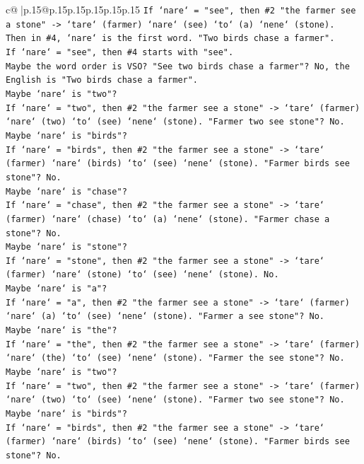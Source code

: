 \documentclass{article}
\begin{document}
{\begin{supertabular}{c@{$\;$}|p{.15\linewidth}@{}p{.15\linewidth}p{.15\linewidth}p{.15\linewidth}p{.15\linewidth}p{.15\linewidth}}
{{{\texttt{If `nare` = "see", then \#2 "the farmer see a stone" {-}> `tare` (farmer) `nare` (see) `to` (a) `nene` (stone).} \\
\texttt{Then in \#4, `nare` is the first word. "Two birds chase a farmer".} \\
\texttt{If `nare` = "see", then \#4 starts with "see".} \\
\texttt{Maybe the word order is VSO? "See two birds chase a farmer"? No, the English is "Two birds chase a farmer".} \\
\texttt{Maybe `nare` is "two"?} \\
\texttt{If `nare` = "two", then \#2 "the farmer see a stone" {-}> `tare` (farmer) `nare` (two) `to` (see) `nene` (stone). "Farmer two see stone"? No.} \\
\texttt{Maybe `nare` is "birds"?} \\
\texttt{If `nare` = "birds", then \#2 "the farmer see a stone" {-}> `tare` (farmer) `nare` (birds) `to` (see) `nene` (stone). "Farmer birds see stone"? No.} \\
\texttt{Maybe `nare` is "chase"?} \\
\texttt{If `nare` = "chase", then \#2 "the farmer see a stone" {-}> `tare` (farmer) `nare` (chase) `to` (a) `nene` (stone). "Farmer chase a stone"? No.} \\
\texttt{Maybe `nare` is "stone"?} \\
\texttt{If `nare` = "stone", then \#2 "the farmer see a stone" {-}> `tare` (farmer) `nare` (stone) `to` (see) `nene` (stone). No.} \\
\texttt{Maybe `nare` is "a"?} \\
\texttt{If `nare` = "a", then \#2 "the farmer see a stone" {-}> `tare` (farmer) `nare` (a) `to` (see) `nene` (stone). "Farmer a see stone"? No.} \\
\texttt{Maybe `nare` is "the"?} \\
\texttt{If `nare` = "the", then \#2 "the farmer see a stone" {-}> `tare` (farmer) `nare` (the) `to` (see) `nene` (stone). "Farmer the see stone"? No.} \\
\texttt{Maybe `nare` is "two"?} \\
\texttt{If `nare` = "two", then \#2 "the farmer see a stone" {-}> `tare` (farmer) `nare` (two) `to` (see) `nene` (stone). "Farmer two see stone"? No.} \\
\texttt{Maybe `nare` is "birds"?} \\
\texttt{If `nare` = "birds", then \#2 "the farmer see a stone" {-}> `tare` (farmer) `nare` (birds) `to` (see) `nene` (stone). "Farmer birds see stone"? No.} \\
}}}
\end{supertabular}}
\end{document}
